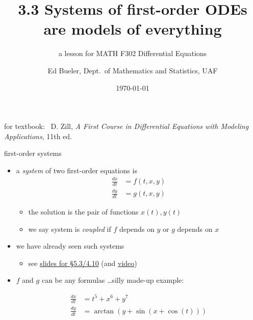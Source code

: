 \documentclass[urlcolor=blue,dvipsnames]{beamer}
\title{3.3 Systems of first-order ODEs \\ are models of everything}
\subtitle{a lesson for MATH F302 Differential Equations}
\author{Ed Bueler, Dept.~of Mathematics and Statistics, UAF}
\date{\tiny \today}
\begin{document}
\renewcommand{\thefootnote}{{\color{green} \arabic{footnote}}}

\begin{frame}
\titlepage

\centerline{\tiny for textbook: \, D. Zill, \emph{A First Course in Differential Equations with Modeling Applications}, 11th ed.}
\end{frame}

\newcommand{\LL}[1]{\mathcal{L}\left\{#1\right\}}
\newcommand{\LLi}[1]{\mathcal{L}^{-1}\left\{#1\right\}}


\begin{frame}{first-order systems}

\begin{itemize}
\item a \emph{system} of two first-order equations is
\begin{align*}
\frac{dx}{dt} &= f(t,x,y) \\
\frac{dy}{dt} &= g(t,x,y)
\end{align*}

\vspace{-2mm}
    \begin{itemize}
    \item the solution is the pair of functions $x(t),y(t)$
    \item we say system is \emph{coupled} if $f$ depends on $y$ or $g$ depends on $x$
    \end{itemize}
\item we have already seen such systems
    \begin{itemize}
    \item see \href{https://bueler.github.io/math302/assets/slides/5-3.pdf}{slides for \S5.3/4.10} (and \href{https://expl.ai/VSJTFRC}{video})
    \end{itemize}
\item $f$ and $g$ can be any formulas \dots silly made-up example:

\vspace{-3mm}
\scriptsize
\begin{align*}
\frac{dx}{dt} &= t^5 + x^6 + y^7 \\
\frac{dy}{dt} &= \arctan(y + \sin(x + \cos(t)))
\end{align*}
\normalsize
\end{itemize}
\end{frame}
\end{document}

